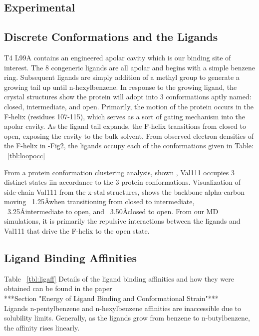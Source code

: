 \documentclass[journal=jctcce,manuscript=article]{achemso}
\begin{document}
\begin{suppinfo}
\section{Experimental}
\subsection{Discrete Conformations and the Ligands}
T4 L99A contains an engineered apolar cavity which is our binding site of interest.
The 8 congeneric ligands are all apolar and begins with a simple benzene ring.
Subsequent ligands are simply addition of a methyl group to generate a growing tail up until n-hexylbenzene.
In response to the growing ligand, the crystal structures show the protein will adopt into 3 conformations aptly named: closed, intermediate, and open.
Primarily, the motion of the protein occurs in the F-helix (residues 107-115), which serves as a sort of gating mechanism into the apolar cavity.
As the ligand tail expands, the F-helix transitions from closed to open, exposing the cavity to the bulk solvent.
From observed electron densities of the F-helix in \cite{Merski2015}-Fig2, the ligands occupy each of the conformations given in Table: ~\ref{tbl:loopocc}

From a protein conformation clustering analysis, shown \cite{Merski2015}, Val111 occupies 3 distinct states iin accordance to the 3 protein conformations.
Visualization of side-chain Val111 from the x-stal structures, shows the backbone alpha-carbon moving ~1.25\AA when transitioning from closed to intermediate, ~3.25\AA intermediate to open, and ~3.50\AA closed to open.
From our MD simulations, it is primarily the repulsive interactions between the ligands and Val111 that drive the F-helix to the open state.

\subsection{Ligand Binding Affinities}
Table ~\ref{tbl:ligaff}
Details of the ligand binding affinities and how they were obtained can be found in the paper \cite{Merski2015} \\
***Section "Energy of Ligand Binding and Conformational Strain"***\\
Ligands n-pentylbenzene and n-hexylbenzene affinities are inaccessible due to solubility limits.
Generally, as the ligands grow from benzene to n-butylbenzene, the affinity rises linearly.


\end{suppinfo}
\end{document}

